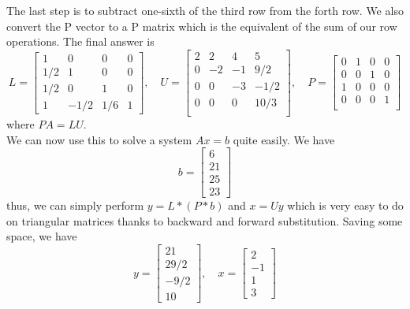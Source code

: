 \documentclass{article}
\begin{document}
The last step is to subtract one-sixth of the third row from the forth
row. We also convert the P vector to a P matrix which is the
equivalent of the sum of our row operations. The final answer is
\[
L=
\begin{bmatrix}
  1  &  0  &  0  &  0\\
  1/2&  1  &  0  &  0\\
  1/2&  0  &  1  &  0\\
  1  &-1/2 & 1/6 &  1
\end{bmatrix}
, \quad
U=
\begin{bmatrix}
  2  &  2  &  4  &  5\\
  0  & -2  & -1  & 9/2\\
  0  &  0  & -3  &-1/2\\
  0  &  0  &  0  &10/3\\
\end{bmatrix}
, \quad
P =
\begin{bmatrix}
  0 & 1 & 0 & 0\\
  0 & 0 & 1 & 0\\
  1 & 0 & 0 & 0\\
  0 & 0 & 0 & 1\\
\end{bmatrix}
\]
where \(PA=LU\).\\
We can now use this to solve a system \(Ax=b\) quite easily. We have
\[
b=
\begin{bmatrix}
  6\\
  21\\
  25\\
  23
\end{bmatrix}
\]
thus, we can simply perform \(y=L*(P*b)\) and \(x=Uy\) which is very
easy to do on triangular matrices thanks to backward and forward
substitution.  Saving some space, we have
\[
y=
\begin{bmatrix}
  21\\
  29/2\\
  -9/2\\
  10
\end{bmatrix}
, \quad
x=
\begin{bmatrix}
  2\\
  -1\\
  1\\
  3
\end{bmatrix}
\]


\section{}
\end{document}
